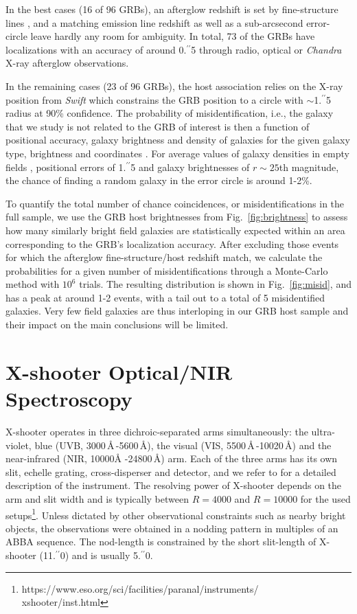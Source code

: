 \documentclass[traditabstract, longauth]{aa}
\newcommand{\farc}{\hbox{$.\!\!^{\prime\prime}$}}
\begin{document}
In the best cases  {(16 of 96 GRBs)}, an afterglow redshift is set by fine-structure lines \citep[e.g.,][]{2007A&A...468...83V}, and a matching emission line redshift as well as a sub-arcsecond error-circle leave hardly any room for ambiguity.  {In total, 73 of the GRBs have localizations with an accuracy of around 0\farc{5} through radio, optical or \textit{Chandra} X-ray afterglow observations.}

In the remaining cases  {(23 of 96 GRBs)}, the host association relies on the X-ray position from \textit{Swift} which constrains the GRB position to a circle with $\sim$1\farc{5} radius at 90\% confidence. The probability of misidentification, i.e., the galaxy that we study is not related to the GRB of interest is then a function of positional accuracy, galaxy brightness and density of galaxies for the given galaxy type, brightness and coordinates \citep[e.g.,][]{2014A&A...572A..47R}. For average values of galaxy densities in empty fields \citep{2004AJ....127..180C, 2006ApJS..162....1G}, positional errors of 1\farc{5} and galaxy brightnesses of $r\sim25$th magnitude, the chance of finding a random galaxy in the error circle is around 1-2\%. 

To quantify the total number of chance coincidences, or misidentifications in the full sample,  {we use the GRB host brightnesses from Fig.~\ref{fig:brightness} to assess how many similarly bright field galaxies \citep{2004AJ....127..180C, 2006ApJS..162....1G} are statistically expected within an area corresponding to the GRB's localization accuracy. After excluding those events for which the afterglow fine-structure/host redshift match, we calculate the probabilities for a given number of misidentifications through a Monte-Carlo method with $10^{6}$ trials. The resulting distribution is shown in Fig.~\ref{fig:misid}, and has a peak at around 1-2 events, with a tail out to a total of 5 misidentified galaxies. Very few field galaxies are thus interloping in our GRB host sample and their impact on the main conclusions will be limited.}

\section{X-shooter Optical/NIR Spectroscopy}
\label{xs}

X-shooter operates in three dichroic-separated arms simultaneously: the ultra-violet, blue (UVB, 3000\,\AA\,-5600\,\AA), the visual (VIS, 5500\,\AA\,-10020\,\AA) and the near-infrared (NIR, 10000\AA\,\,-24800\,\AA) arm. Each of the three arms has its own slit, echelle grating, cross-disperser and detector, and we refer to \citet{2011A&A...536A.105V} for a detailed description of the instrument. The resolving power of X-shooter depends on the arm and slit width and is typically between $R=4000$ and $R=10000$ for the used setups\footnote{https://www.eso.org/sci/facilities/paranal/instruments/\\xshooter/inst.html}. Unless dictated by other observational constraints such as nearby bright objects, the observations were obtained in a nodding pattern in multiples of an ABBA sequence. The nod-length is constrained by the short slit-length of X-shooter (11\farc{0}) and is usually 5\farc{0}. 
\end{document}
